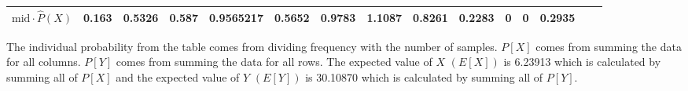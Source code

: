 \begin{table}[hb!]
\begin{adjustbox}{width = \textwidth, center}
\begin{tabular}{|c|r|r|r|r|r|r|r|r|r|r|r|r|r|r|}
        \cellcolor[HTML]{D9EAD3}$\mathrm{mid}\cdot\widehat{P}(X)$   & \cellcolor[HTML]{D9EAD3}0.163                  & \cellcolor[HTML]{D9EAD3}0.5326                 & \cellcolor[HTML]{D9EAD3}0.587                  & \cellcolor[HTML]{D9EAD3}0.9565217              & \cellcolor[HTML]{D9EAD3}0.5652                 & \cellcolor[HTML]{D9EAD3}0.9783                 & \cellcolor[HTML]{D9EAD3}1.1087                 & \cellcolor[HTML]{D9EAD3}0.8261                  & \cellcolor[HTML]{D9EAD3}0.2283                  & \cellcolor[HTML]{D9EAD3}0                       & \cellcolor[HTML]{D9EAD3}0                       & \cellcolor[HTML]{D9EAD3}0.2935                  & \multicolumn{1}{l|}{}                                                           & \multicolumn{1}{l|}{}                                                                 \\ \hline
        \end{tabular}
    \end{adjustbox}
\end{table}
\noindent The individual probability from the table comes from dividing frequency with the number of samples. $P[X]$ comes from summing the data for all columns. $P[Y]$ comes from summing the data for all rows. The expected value of $X$ $(E[X])$ is 6.23913 which is calculated by summing all of $P[X]$ and the expected value of $Y$ $(E[Y])$ is 30.10870 which is calculated by summing all of $P[Y]$.
